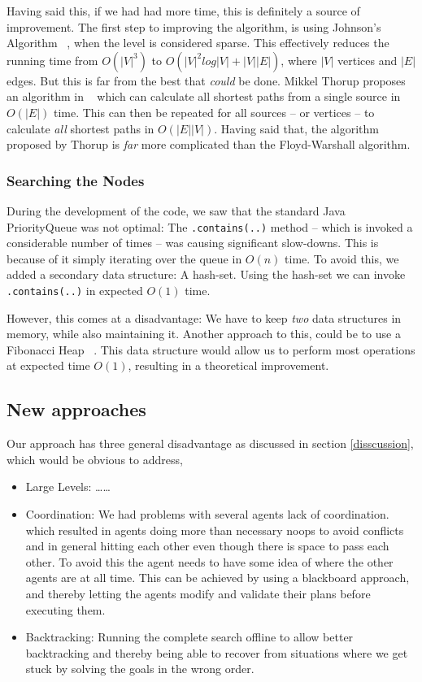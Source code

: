 \documentclass[letterpaper]{article}
\begin{document}
		Having said this, if we had had more time, this is definitely a source of improvement. The first step to improving the algorithm, is using Johnson's Algorithm ~\cite{jonhson}, when the level is considered sparse. This effectively reduces the running time from $O(|V|^3)$ to $O(|V|^2log|V|+|V||E|)$, where $|V|$ vertices and $|E|$ edges. But this is far from the best that \emph{could} be done. Mikkel Thorup proposes an algorithm in ~\cite{thorup} which can calculate all shortest paths from a single source in $O(|E|)$ time. This can then be repeated for all sources -- or vertices -- to calculate \emph{all} shortest paths in $O(|E||V|)$. Having said that, the algorithm proposed by Thorup is \emph{far} more complicated than the Floyd-Warshall algorithm.


	\subsubsection{Searching the Nodes}
		During the development of the code, we saw that the standard Java PriorityQueue was not optimal: The \verb=.contains(..)= method -- which is invoked a considerable number of times -- was causing significant slow-downs. This is because of it simply iterating over the queue in $O(n)$ time. To avoid this, we added a secondary data structure: A hash-set. Using the hash-set we can invoke \verb=.contains(..)= in expected $O(1)$ time.

		However, this comes at a disadvantage: We have to keep \emph{two} data structures in memory, while also maintaining it. Another approach to this, could be to use a Fibonacci Heap ~\cite{fibonacci}. This data structure would allow us to perform most operations at expected time $O(1)$, resulting in a theoretical improvement.

	\subsection{New approaches}
	Our approach has three general disadvantage as discussed in section \ref{disscussion}, which would be obvious to address,
	\begin{itemize}
		\item{Large Levels:}
			\dots \dots
		\item{Coordination:}
			We had problems with several agents lack of coordination. which resulted in agents doing more than necessary noops to avoid conflicts and in general hitting each other even though there is space to pass each other. To avoid this the agent needs to have some idea of where the other agents are at all time. This can be achieved by using a  blackboard approach, and thereby letting the agents modify and validate their plans before executing them.
		\item{Backtracking:}
			Running the complete search offline to allow better backtracking and thereby being able to recover from situations where we get stuck by solving the goals in the wrong order. 
	\end{itemize}
\end{document}
